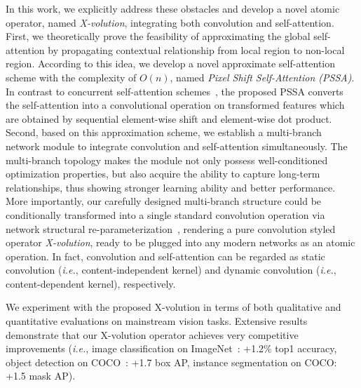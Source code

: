 \documentclass{article}
\begin{document}
In this work, we explicitly address these obstacles and develop a novel atomic operator, named \emph{X-volution}, integrating both convolution and self-attention.
First, we theoretically prove the feasibility of approximating the global self-attention by propagating contextual relationship from local region to non-local region.
According to this idea, we develop a novel approximate self-attention scheme with the complexity of $O(n)$, named \emph{Pixel Shift Self-Attention (PSSA)}.
In contrast to concurrent self-attention schemes~\cite{DBLP:conf/nips/VaswaniSPUJGKP17,DBLP:journals/corr/abs-2103-14030,DBLP:journals/corr/abs-2103-12731}, the proposed PSSA 
converts the self-attention into a convolutional operation on transformed features which are obtained by sequential element-wise shift and element-wise dot product. 
Second, based on this approximation scheme, we establish a multi-branch network module to integrate convolution and self-attention simultaneously.
The multi-branch topology makes the module not only possess well-conditioned optimization properties, but also acquire the ability to capture long-term relationships, thus showing stronger learning ability and better performance.
More importantly, 
our carefully designed multi-branch structure could be conditionally transformed into a single standard convolution operation via network structural re-parameterization~\cite{DBLP:journals/corr/abs-2101-03697}, rendering a pure convolution styled operator \emph{X-volution}, ready to be plugged into any modern networks as an atomic operation.
In fact, convolution and self-attention can be regarded as static convolution (\emph{i.e.}, content-independent kernel) and dynamic convolution (\emph{i.e.}, content-dependent kernel), respectively.







We experiment with the proposed X-volution in terms of both qualitative and quantitative evaluations on mainstream vision tasks.
Extensive results demonstrate that our X-volution operator achieves very competitive improvements (\emph{i.e.}, image classification on ImageNet~\cite{DBLP:journals/ijcv/RussakovskyDSKS15}: +1.2\% top1 accuracy, object detection on COCO~\cite{DBLP:conf/eccv/LinMBHPRDZ14}: +1.7 box AP, instance segmentation on COCO: +1.5 mask AP).
\end{document}
